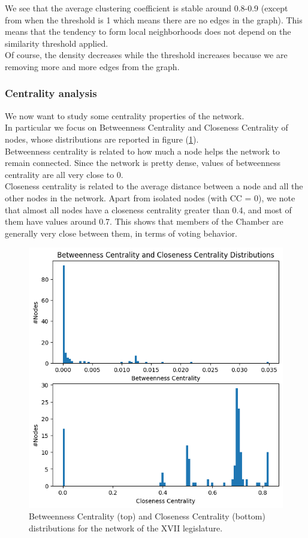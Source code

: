 We see that the average clustering coefficient is stable around 0.8-0.9 (except from when the threshold is 1 which means there are no edges in the graph). This means that the tendency to form local neighborhoods does not depend on the similarity threshold applied.\\
Of course, the density decreases while the threshold increases because we are removing more and more edges from the graph.

\subsubsection{Centrality analysis}
We now want to study some centrality properties of the network.\\
In particular we focus on Betweenness Centrality and Closeness Centrality of nodes, whose distributions are reported in figure (\ref{fig:centrality}).\\

Betweenness centrality is related to how much a node helps the network to remain connected. Since the network is pretty dense, values of betweenness centrality are all very close to 0.\\

Closeness centrality is related to the average distance between a node and all the other nodes in the network. Apart from isolated nodes (with CC = 0), we note that almost all nodes have a closeness centrality greater than 0.4, and most of them have values around 0.7. This shows that members of the Chamber are generally very close between them, in terms of voting behavior.
\begin{figure}[h]
  \centering
  \includegraphics[width=\linewidth]{img/centrality_xvii.png}
  \caption{Betweenness Centrality (top) and Closeness Centrality (bottom) distributions for the network of the XVII legislature.}
  \label{fig:centrality}
\end{figure}

